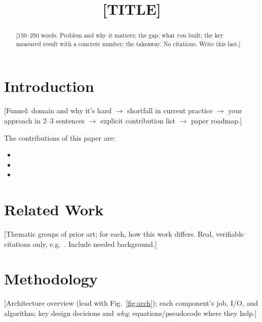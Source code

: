 \documentclass[conference]{IEEEtran}
\begin{document}
\title{[TITLE]}

\author{
}

\maketitle

\begin{abstract}
[150--250 words. Problem and why it matters; the gap; what you built; the key measured
result with a concrete number; the takeaway. No citations. Write this last.]
\end{abstract}

\begin{IEEEkeywords}
\end{IEEEkeywords}

\section{Introduction}\label{sec:intro}
[Funnel: domain and why it's hard $\rightarrow$ shortfall in current practice $\rightarrow$
your approach in 2--3 sentences $\rightarrow$ explicit contribution list $\rightarrow$ paper roadmap.]

The contributions of this paper are:
\begin{itemize}
  \item [Contribution 1]
  \item [Contribution 2]
  \item [Contribution 3]
\end{itemize}

\section{Related Work}\label{sec:related}
[Thematic groups of prior art; for each, how this work differs. Real, verifiable
citations only, e.g.~\cite{ref1}. Include needed background.]

\section{Methodology}\label{sec:method}
[Architecture overview (lead with Fig.~\ref{fig:arch}); each component's job, I/O, and
algorithm; key design decisions and \emph{why}; equations/pseudocode where they help.]
\end{document}
